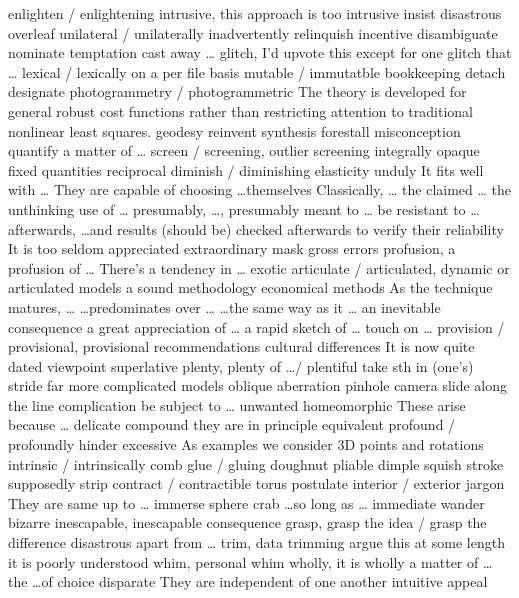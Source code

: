 \documentclass[12pt]{article}
\begin{document}
enlighten / enlightening 
intrusive, this approach is too intrusive 
insist 
disastrous 
overleaf 
unilateral / unilaterally 
inadvertently 
relinquish 
incentive 
disambiguate 
nominate 
temptation 
cast away \dots 
glitch, I'd upvote this except for one glitch that \dots 
lexical / lexically 
on a per file basis 
mutable / immutatble 
bookkeeping 
detach 
designate 
photogrammetry / photogrammetric 
The theory is developed for general robust cost functions rather than restricting attention to traditional nonlinear least squares.
geodesy 
reinvent 
synthesis 
forestall 
misconception 
quantify 
a matter of \dots 
screen / screening, outlier screening 
integrally 
opaque 
fixed quantities 
reciprocal 
diminish / diminishing 
elasticity 
unduly 
It fits well with \dots 
They are capable of choosing \dots themselves 
Classically, \dots 
the claimed \dots 
the unthinking use of \dots 
presumably, \dots, presumably meant to \dots 
be resistant to \dots 
afterwards, \dots and results (should be) checked afterwards to verify their reliability 
It is too seldom appreciated 
extraordinary 
mask gross errors 
profusion, a profusion of \dots 
There's a tendency in \dots 
exotic 
articulate / articulated, dynamic or articulated models 
a sound methodology 
economical methods 
As the technique matures, \dots 
\dots predominates over \dots 
\dots the same way as it \dots 
an inevitable consequence 
a great appreciation of \dots 
a rapid sketch of \dots 
touch on \dots 
provision / provisional, provisional recommendations 
cultural differences 
It is now quite dated 
viewpoint 
superlative 
plenty, plenty of \dots / plentiful 
take sth in (one's) stride 
far more complicated models 
oblique 
aberration 
pinhole camera 
slide along the line 
complication 
be subject to \dots 
unwanted 
homeomorphic 
These arise because \dots 
delicate 
compound 
they are in principle equivalent 
profound / profoundly 
hinder 
excessive 
As examples we consider 3D points and rotations 
intrinsic / intrinsically 
comb 
glue / gluing 
doughnut 
pliable 
dimple 
squish 
stroke 
supposedly 
strip 
contract / contractible 
torus 
postulate 
interior / exterior 
jargon 
They are same up to \dots 
immerse 
sphere 
crab 
\dots so long as \dots 
immediate 
wander 
bizarre 
inescapable, inescapable consequence 
grasp, grasp the idea / grasp the difference 
disastrous 
apart from \dots 
trim, data trimming 
argue this at some length 
it is poorly understood 
whim, personal whim 
wholly, it is wholly a matter of \dots 
the \dots of choice 
disparate 
They are independent of one another 
intuitive appeal 
\end{document}
